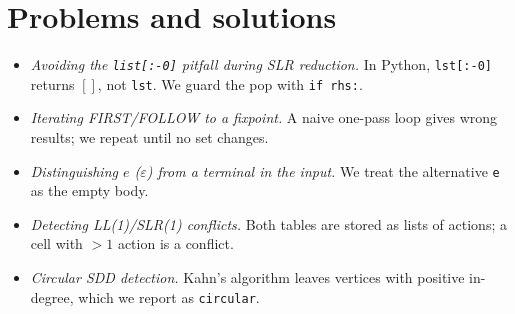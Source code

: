 \documentclass[11pt]{article}
\begin{document}
\section{Problems and solutions}
\begin{itemize}
\item \emph{Avoiding the \texttt{list[:-0]} pitfall during SLR reduction.} In
Python, \texttt{lst[:-0]} returns $[]$, not \texttt{lst}. We guard the pop with
\texttt{if rhs:}.
\item \emph{Iterating FIRST/FOLLOW to a fixpoint.} A naive one-pass loop gives
wrong results; we repeat until no set changes.
\item \emph{Distinguishing $e$ ($\varepsilon$) from a terminal in the input.} We
treat the alternative \texttt{e} as the empty body.
\item \emph{Detecting LL(1)/SLR(1) conflicts.} Both tables are stored as lists of
actions; a cell with $>1$ action is a conflict.
\item \emph{Circular SDD detection.} Kahn's algorithm leaves vertices with
positive in-degree, which we report as \texttt{circular}.
\end{itemize}
\end{document}
